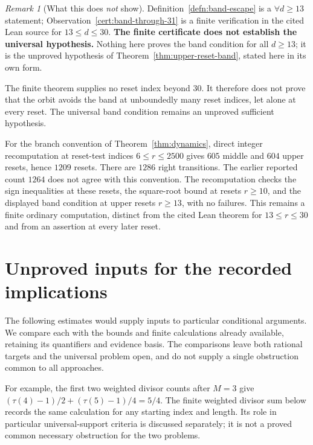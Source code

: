 \documentclass[11pt]{article}
\theoremstyle{plain}
\theoremstyle{definition}
\theoremstyle{remark}
\newtheorem{rem}[thm]{Remark}
\begin{document}
\begin{rem}[What this does \emph{not} show]
\label{rem:band-caveat}
Definition~\ref{defn:band-escape} is a $\forall d\ge13$ statement; Observation~\ref{cert:band-through-31}
is a finite verification in the cited Lean source for $13\le d\le30$. \textbf{The
finite certificate does not establish the universal hypothesis.} Nothing here proves the band
condition for all $d\ge13$; it is the unproved hypothesis of
Theorem~\ref{thm:upper-reset-band}, stated here in its own form.

\par\medskip

The finite theorem supplies no reset index beyond $30$. It therefore
does not prove that the orbit avoids the band at unboundedly many reset
indices, let alone at every reset. The universal band condition remains
an unproved sufficient hypothesis.

\par\medskip

For the branch convention of Theorem~\ref{thm:dynamics}, direct
integer recomputation at reset-test indices $6\le r\le2500$
gives $605$ middle and $604$ upper resets, hence $1209$ resets.
There are $1286$ right transitions.  The earlier reported count
$1264$ does not agree with this convention.  The recomputation
checks the sign inequalities at these resets, the square-root
bound at resets $r\ge10$, and the displayed band condition at
upper resets $r\ge13$, with no failures.  This remains a finite
ordinary computation, distinct from the cited Lean theorem for
$13\le r\le30$ and from an assertion at every later reset.
\end{rem}
\section{Unproved inputs for the recorded implications}
\label{sec:invent-257}
The following estimates would supply inputs to particular conditional
arguments. We compare each with the bounds and finite calculations
already available, retaining its quantifiers and evidence basis. The
comparisons leave both rational targets and the universal problem open,
and do not supply a single obstruction common to all approaches.

For example, the first two weighted divisor counts after $M=3$
give $(\tau(4)-1)/2+(\tau(5)-1)/4=5/4$.
The finite weighted divisor sum below records the same calculation
for any starting index and length.  Its role in particular universal-support
criteria is discussed separately; it is not a proved common necessary
obstruction for the two problems.
\end{document}
